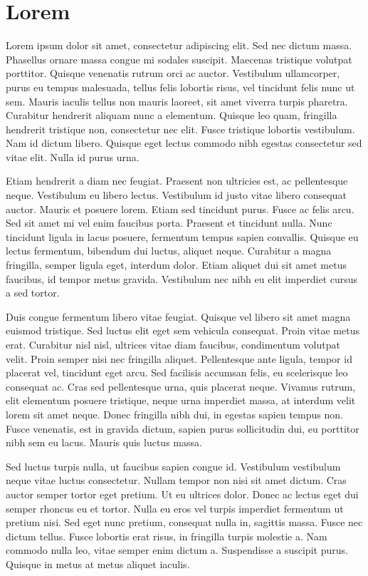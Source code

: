 \documentclass[journal]{IEEEtran}
\begin{document}
\section{Lorem}
Lorem ipsum dolor sit amet, consectetur adipiscing elit. Sed nec dictum massa. Phasellus ornare massa congue mi sodales suscipit. Maecenas tristique volutpat porttitor. Quisque venenatis rutrum orci ac auctor. Vestibulum ullamcorper, purus eu tempus malesuada, tellus felis lobortis risus, vel tincidunt felis nunc ut sem. Mauris iaculis tellus non mauris laoreet, sit amet viverra turpis pharetra. Curabitur hendrerit aliquam nunc a elementum. Quisque leo quam, fringilla hendrerit tristique non, consectetur nec elit. Fusce tristique lobortis vestibulum. Nam id dictum libero. Quisque eget lectus commodo nibh egestas consectetur sed vitae elit. Nulla id purus urna.

Etiam hendrerit a diam nec feugiat. Praesent non ultricies est, ac pellentesque neque. Vestibulum eu libero lectus. Vestibulum id justo vitae libero consequat auctor. Mauris et posuere lorem. Etiam sed tincidunt purus. Fusce ac felis arcu. Sed sit amet mi vel enim faucibus porta. Praesent et tincidunt nulla. Nunc tincidunt ligula in lacus posuere, fermentum tempus sapien convallis. Quisque eu lectus fermentum, bibendum dui luctus, aliquet neque. Curabitur a magna fringilla, semper ligula eget, interdum dolor. Etiam aliquet dui sit amet metus faucibus, id tempor metus gravida. Vestibulum nec nibh eu elit imperdiet cursus a sed tortor.

Duis congue fermentum libero vitae feugiat. Quisque vel libero sit amet magna euismod tristique. Sed luctus elit eget sem vehicula consequat. Proin vitae metus erat. Curabitur nisl nisl, ultrices vitae diam faucibus, condimentum volutpat velit. Proin semper nisi nec fringilla aliquet. Pellentesque ante ligula, tempor id placerat vel, tincidunt eget arcu. Sed facilisis accumsan felis, eu scelerisque leo consequat ac. Cras sed pellentesque urna, quis placerat neque. Vivamus rutrum, elit elementum posuere tristique, neque urna imperdiet massa, at interdum velit lorem sit amet neque. Donec fringilla nibh dui, in egestas sapien tempus non. Fusce venenatis, est in gravida dictum, sapien purus sollicitudin dui, eu porttitor nibh sem eu lacus. Mauris quis luctus massa.

Sed luctus turpis nulla, ut faucibus sapien congue id. Vestibulum vestibulum neque vitae luctus consectetur. Nullam tempor non nisi sit amet dictum. Cras auctor semper tortor eget pretium. Ut eu ultrices dolor. Donec ac lectus eget dui semper rhoncus eu et tortor. Nulla eu eros vel turpis imperdiet fermentum ut pretium nisi. Sed eget nunc pretium, consequat nulla in, sagittis massa. Fusce nec dictum tellus. Fusce lobortis erat risus, in fringilla turpis molestie a. Nam commodo nulla leo, vitae semper enim dictum a. Suspendisse a suscipit purus. Quisque in metus at metus aliquet iaculis.
\end{document}
